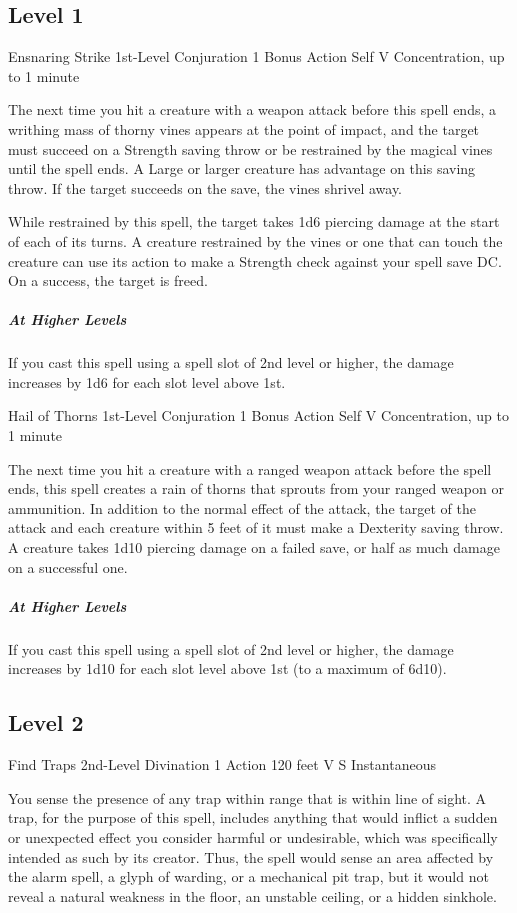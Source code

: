 \documentclass[letterpaper,openany,oneside,twocolumn]{book}
\begin{document}
\subsection*{Level 1}

\DndSpellHeader
  {Ensnaring Strike}
  {1st-Level Conjuration}
  {1 Bonus Action}
  {Self}
  {V}
  {Concentration, up to 1 minute}

The next time you hit a creature with a weapon attack before this spell ends, a writhing mass of thorny vines appears at the point of impact, and the target must succeed on a Strength saving throw or be restrained by the magical vines until the spell ends. A Large or larger creature has advantage on this saving throw. If the target succeeds on the save, the vines shrivel away.

While restrained by this spell, the target takes 1d6 piercing damage at the start of each of its turns. A creature restrained by the vines or one that can touch the creature can use its action to make a Strength check against your spell save DC. On a success, the target is freed.

\subparagraph*{At Higher Levels} If you cast this spell using a spell slot of 2nd level or higher, the damage increases by 1d6 for each slot level above 1st.

\DndSpellHeader
  {Hail of Thorns}
  {1st-Level Conjuration}
  {1 Bonus Action}
  {Self}
  {V}
  {Concentration, up to 1 minute}

The next time you hit a creature with a ranged weapon attack before the spell ends, this spell creates a rain of thorns that sprouts from your ranged weapon or ammunition. In addition to the normal effect of the attack, the target of the attack and each creature within 5 feet of it must make a Dexterity saving throw. A creature takes 1d10 piercing damage on a failed save, or half as much damage on a successful one.

\subparagraph{At Higher Levels} If you cast this spell using a spell slot of 2nd level or higher, the damage increases by 1d10 for each slot level above 1st (to a maximum of 6d10).

\subsection*{Level 2}

\DndSpellHeader
  {Find Traps}
  {2nd-Level Divination}
  {1 Action}
  {120 feet}
  {V S}
  {Instantaneous}

You sense the presence of any trap within range that is within line of sight. A trap, for the purpose of this spell, includes anything that would inflict a sudden or unexpected effect you consider harmful or undesirable, which was specifically intended as such by its creator. Thus, the spell would sense an area affected by the alarm spell, a glyph of warding, or a mechanical pit trap, but it would not reveal a natural weakness in the floor, an unstable ceiling, or a hidden sinkhole.
\end{document}
